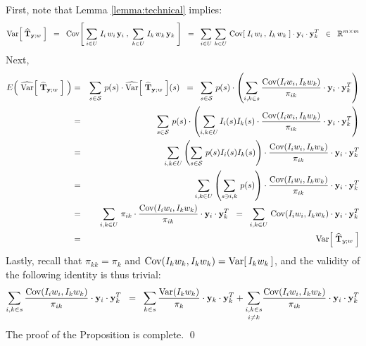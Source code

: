 \documentclass{article}
\begin{document}
\proof
First, note that Lemma \ref{lemma:technical} implies:
\begin{equation*}
\textnormal{Var}\!\left[\;\widehat{\mathbf{T}}_{\mathbf{y};w}\;\right]
\;\;=\;\; \textnormal{Cov}\!\left[\;\sum_{i\in U}\,I_{i}\,w_{i}\,\mathbf{y}_{i}\;,\;\sum_{k\in U}\,I_{k}\,w_{k}\,\mathbf{y}_{k}\;\right]
\;\;=\;\; \sum_{i\in U}\,\sum_{k\in U}\,\textnormal{Cov}\!\left[\;I_{i}\,w_{i}\,,\,I_{k}\,w_{k}\;\right]\cdot\mathbf{y}_{i}\cdot\mathbf{y}_{k}^{T}
\;\;\in\;\;\mathbb{R}^{m \times m}
\end{equation*}
Next,
\begin{eqnarray*}
E\!\left(\;\widehat{\textnormal{Var}}\!\left[\;\widehat{\mathbf{T}}_{\mathbf{y};w}\;\right]\;\right)
&=& \sum_{s\in\mathcal{S}}\,p(s)\cdot\widehat{\textnormal{Var}}\!\left[\;\widehat{\mathbf{T}}_{\mathbf{y};w}\;\right]\!(s)
\;\;=\;\; \sum_{s\in\mathcal{S}}\,p(s)\cdot\left(\sum_{i,k \in s}\dfrac{\textnormal{Cov}(I_{i}w_{i},I_{k}w_{k})}{\pi_{ik}}\cdot\mathbf{y}_{i}\cdot\mathbf{y}_{k}^{T}\right) \\
&=& \sum_{s\in\mathcal{S}}\,p(s)\cdot
\left(\sum_{i,k \in U}I_{i}(s)I_{k}(s)\cdot\dfrac{\textnormal{Cov}(I_{i}w_{i},I_{k}w_{k})}{\pi_{ik}}\cdot\mathbf{y}_{i}\cdot\mathbf{y}_{k}^{T}\right) \\
&=& \sum_{i,k \in U}\left(\sum_{s\in\mathcal{S}}\,p(s)I_{i}(s)I_{k}(s)\right)\cdot\dfrac{\textnormal{Cov}(I_{i}w_{i},I_{k}w_{k})}{\pi_{ik}}\cdot\mathbf{y}_{i}\cdot\mathbf{y}_{k}^{T} \\
&=& \sum_{i,k \in U}\left(\sum_{s\ni i, k}\,p(s)\right)\cdot\dfrac{\textnormal{Cov}(I_{i}w_{i},I_{k}w_{k})}{\pi_{ik}}\cdot\mathbf{y}_{i}\cdot\mathbf{y}_{k}^{T} \\
&=& \sum_{i,k \in U}\,\pi_{ik}\cdot\dfrac{\textnormal{Cov}(I_{i}w_{i},I_{k}w_{k})}{\pi_{ik}}\cdot\mathbf{y}_{i}\cdot\mathbf{y}_{k}^{T}
\;\;=\;\; \sum_{i,k \in U}\,\textnormal{Cov}(I_{i}w_{i},I_{k}w_{k})\cdot\mathbf{y}_{i}\cdot\mathbf{y}_{k}^{T} \\
&=& \textnormal{Var}\!\left[\;\widehat{\mathbf{T}}_{y;w}\;\right]
\end{eqnarray*}
Lastly, recall that $\pi_{kk} = \pi_{k}$ and $\textnormal{Cov}(I_{k}w_{k},I_{k}w_{k}) = \textnormal{Var}[\,I_{k}w_{k}\,]$,
and the validity of the following identity is thus trivial:
\begin{equation*}
\sum_{i,k \in s}\dfrac{\textnormal{Cov}(I_{i}w_{i},I_{k}w_{k})}{\pi_{ik}}\cdot\mathbf{y}_{i}\cdot\mathbf{y}_{k}^{T}
\;\;=\;\; \sum_{k \in s}\dfrac{\textnormal{Var}(I_{k}w_{k})}{\pi_{k}}\cdot\mathbf{y}_{k}\cdot\mathbf{y}_{k}^{T}
       + \underset{i \neq k}{\sum_{i,k \in s}}\dfrac{\textnormal{Cov}(I_{i}w_{i},I_{k}w_{k})}{\pi_{ik}}\cdot\mathbf{y}_{i}\cdot\mathbf{y}_{k}^{T}
\end{equation*}
The proof of the Proposition is complete.
\qed
\end{document}
